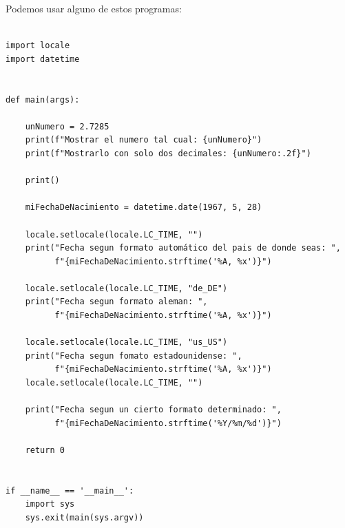 \documentclass[spanish,12pt,a4paper,final,oneside]{book}
\begin{document}
Podemos usar alguno de estos programas:

\begin{lstlisting}[frame=single, caption=lenguaje python]

import locale
import datetime


def main(args):

    unNumero = 2.7285
    print(f"Mostrar el numero tal cual: {unNumero}")
    print(f"Mostrarlo con solo dos decimales: {unNumero:.2f}")

    print()

    miFechaDeNacimiento = datetime.date(1967, 5, 28)

    locale.setlocale(locale.LC_TIME, "")
    print("Fecha segun formato automático del pais de donde seas: ",
          f"{miFechaDeNacimiento.strftime('%A, %x')}")

    locale.setlocale(locale.LC_TIME, "de_DE")
    print("Fecha segun formato aleman: ",
          f"{miFechaDeNacimiento.strftime('%A, %x')}")

    locale.setlocale(locale.LC_TIME, "us_US")
    print("Fecha segun fomato estadounidense: ",
          f"{miFechaDeNacimiento.strftime('%A, %x')}")
    locale.setlocale(locale.LC_TIME, "")

    print("Fecha segun un cierto formato determinado: ",
          f"{miFechaDeNacimiento.strftime('%Y/%m/%d')}")

    return 0


if __name__ == '__main__':
    import sys
    sys.exit(main(sys.argv))
\end{lstlisting}
\end{document}
